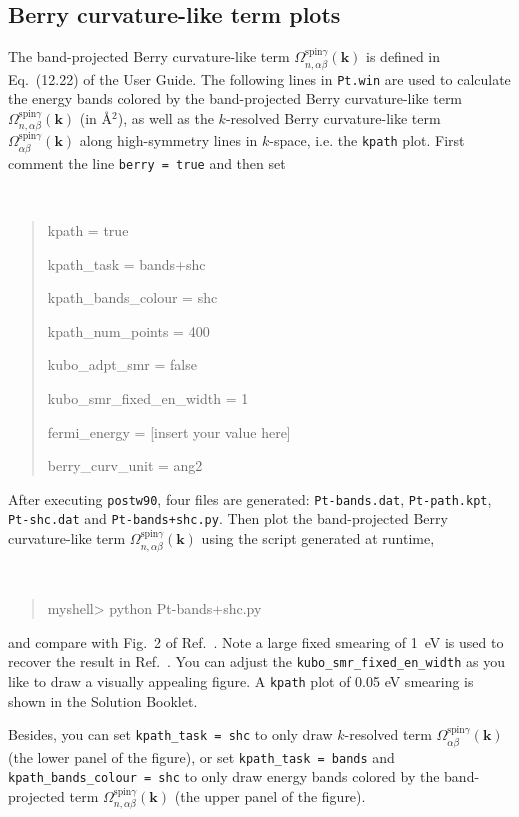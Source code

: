\documentclass[a4paper,11pt,twoside]{article}
\begin{document}
\subsection*{Berry curvature-like term plots}

The band-projected Berry curvature-like term 
$\Omega_{n,\alpha\beta}^{\text{spin} \gamma}({\bm k})$ 
is defined in Eq.~(12.22) of the User Guide.  The following
lines in {\tt Pt.win} are used to calculate the energy bands colored by the
band-projected Berry curvature-like term 
$\Omega_{n,\alpha\beta}^{\text{spin} \gamma}({\bm k})$ (in \AA$^2$), 
as well as the $k$-resolved Berry curvature-like term 
$\Omega_{\alpha\beta}^{\text{spin} \gamma}({\bm k})$ 
along high-symmetry lines in $k$-space, i.e. the {\tt kpath} plot. First comment the line {\tt berry = true} and then set 
{\tt
	\begin{quote}
		
		kpath = true
		
		kpath\_task = bands+shc
		
		kpath\_bands\_colour = shc
		
		kpath\_num\_points = 400
		
		kubo\_adpt\_smr = false
		
		kubo\_smr\_fixed\_en\_width = 1
		
		fermi\_energy = [insert your value here] 
		
		berry\_curv\_unit = ang2
\end{quote} }

After executing {\tt postw90}, four files are generated: {\tt Pt-bands.dat}, {\tt Pt-path.kpt}, {\tt Pt-shc.dat} and {\tt Pt-bands+shc.py}. 
Then plot the band-projected Berry curvature-like term 
$\Omega_{n,\alpha\beta}^{\text{spin}\gamma}({\bm k})$ 
using the script generated at runtime, 
%
{\tt
	\begin{quote}
		myshell> python Pt-bands+shc.py
\end{quote} }

and compare with Fig.~2 of Ref.~\cite{qiao-prb2018}. Note a 
large fixed smearing of 1~eV is used to recover the result in Ref.~\cite{qiao-prb2018}. 
You can adjust the {\tt kubo\_smr\_fixed\_en\_width} 
as you like to draw a visually appealing figure. 
A {\tt kpath} plot of 0.05 eV smearing is shown in the 
Solution Booklet. 

Besides, you can set {\tt kpath\_task = shc} to only draw 
$k$-resolved term 
$\Omega_{\alpha\beta}^{\text{spin} \gamma}({\bm k})$ 
(the lower panel of the figure), or set 
{\tt kpath\_task = bands} and {\tt kpath\_bands\_colour = shc} 
to only draw energy bands colored by the
band-projected term 
$\Omega_{n,\alpha\beta}^{\text{spin} \gamma}({\bm k})$  
(the upper panel of the figure). 
	
\end{document}
